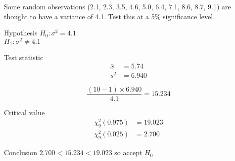         \begin{example}
        {
            Some random observations (2.1, 2.3, 3.5, 4.6, 5.0, 6.4, 7.1, 8.6, 8.7, 9.1) are thought to have a variance of 4.1. Test this at a 5\% significance level.
        }
        
        \begin{step}{Hypothesis}
        $H_0: \sigma^2 = 4.1$\\
        $H_1: \sigma^2 \ne 4.1$
        \end{step}

        \begin{step}{Test statistic}
        \begin{align*} 
        \bar{x} &= 5.74 \\ 
        s^2 &= 6.940 
        \end{align*} 

        $$\frac{(10 - 1) \times 6.940}{4.1} = 15.234$$
        \end{step}

        \begin{step}{Critical value}
        \begin{align*} 
        \chi^2_9(0.975) &= 19.023\\ 
        \chi^2_9(0.025) &= 2.700
        \end{align*}
        \end{step}

        \begin{step}{Conclusion}
        $2.700 < 15.234 < 19.023$ so accept $H_0$
        \end{step}

        \end{example}

    \newpage

